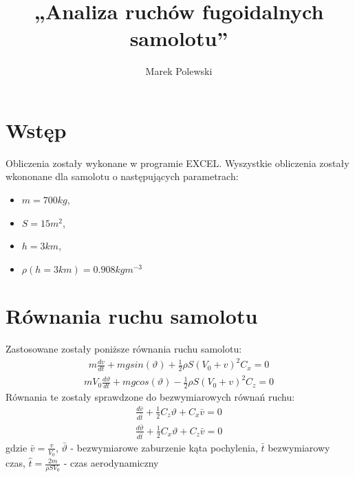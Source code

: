 \documentclass{sprawozdanie}
\title{„Analiza ruchów fugoidalnych samolotu”}
\author{Marek Polewski}
\begin{document}
\maketitle

\newpage


\setcounter{page}{1}



\section{Wstęp}
Obliczenia zostały wykonane w programie EXCEL. Wyszystkie obliczenia zostały wkononane dla samolotu o następujących parametrach:
\begin{itemize}
    \item $m = 700kg$,
    \item $S = 15 m^2$,
    \item $h = 3km$,
    \item $\rho(h = 3km) = 0.908 kgm^{-3}$
\end{itemize}

\section{Równania ruchu samolotu}
Zastosowane zostały poniższe równania ruchu samolotu:
\begin{align}
    m \frac{dv}{dt} + mg sin(\vartheta) + \frac{1}{2}\rho S(V_0+v)^2 C_x = 0
\end{align}
\begin{align}
    mV_0 \frac{d\vartheta}{dt} + mg cos(\vartheta) - \frac{1}{2}\rho S(V_0+v)^2 C_z = 0
\end{align}
Równania te zostały sprawdzone do bezwymiarowych równań ruchu:
\begin{align}
    \frac{d\bar v}{d\bar t} + \frac{1}{2} C_z \vartheta + C_x \bar v = 0
\end{align}
\begin{align}
    \frac{d\bar \vartheta}{d\bar t} + \frac{1}{2} C_x \vartheta + C_z \bar v = 0
\end{align}
gdzie $\bar v = \frac{v}{V_0}$, $\bar \vartheta $ - bezwymiarowe zaburzenie kąta pochylenia, $\bar t$ bezwymiarowy czas, $\hat t = \frac{2m}{\rho S V_0}$ - czas aerodynamiczny
\end{document}
